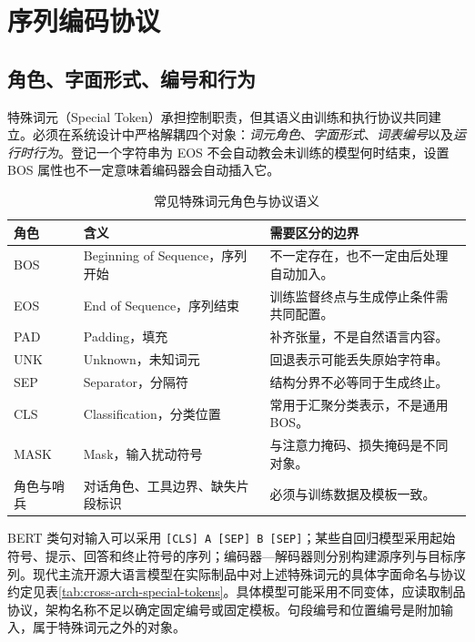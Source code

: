 \documentclass[../textbook.tex]{subfiles}
\begin{document}
\section{序列编码协议}

\subsection{角色、字面形式、编号和行为}
特殊词元（Special Token）承担控制职责，但其语义由训练和执行协议共同建立。必须在系统设计中严格解耦四个对象：\emph{词元角色}、\emph{字面形式}、\emph{词表编号}以及\emph{运行时行为}。登记一个字符串为 EOS 不会自动教会未训练的模型何时结束，设置 BOS 属性也不一定意味着编码器会自动插入它。

\begin{table}[htbp]
\centering
\caption{常见特殊词元角色与协议语义}\label{tab:special-tokens}
\begin{tabularx}{\linewidth}{p{20mm}p{38mm}X}
\toprule 角色 & 含义 & 需要区分的边界\\\midrule
BOS & Beginning of Sequence，序列开始 & 不一定存在，也不一定由后处理自动加入。\\
EOS & End of Sequence，序列结束 & 训练监督终点与生成停止条件需共同配置。\\
PAD & Padding，填充 & 补齐张量，不是自然语言内容。\\
UNK & Unknown，未知词元 & 回退表示可能丢失原始字符串。\\
SEP & Separator，分隔符 & 结构分界不必等同于生成终止。\\
CLS & Classification，分类位置 & 常用于汇聚分类表示，不是通用 BOS。\\
MASK & Mask，输入扰动符号 & 与注意力掩码、损失掩码是不同对象。\\
角色与哨兵 & 对话角色、工具边界、缺失片段标识 & 必须与训练数据及模板一致。\\
\bottomrule
\end{tabularx}
\end{table}

BERT 类句对输入可以采用 \texttt{[CLS] A [SEP] B [SEP]}；某些自回归模型采用起始符号、提示、回答和终止符号的序列；编码器—解码器则分别构建源序列与目标序列。现代主流开源大语言模型在实际制品中对上述特殊词元的具体字面命名与协议约定见表\ref{tab:cross-arch-special-tokens}。具体模型可能采用不同变体，应读取制品协议，架构名称不足以确定固定编号或固定模板。句段编号和位置编号是附加输入，属于特殊词元之外的对象。
\end{document}

